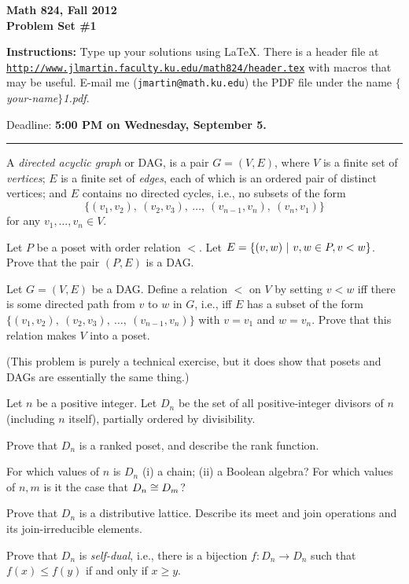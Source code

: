 

\bf Math 824, Fall 2012\\
Problem Set \#1\rm

{\bf Instructions:} Type up your solutions using LaTeX.  There is a
header file at\\
\href{http://www.jlmartin.faculty.ku.edu/math824/header.tex}{\tt http://www.jlmartin.faculty.ku.edu/math824/header.tex} with macros that may be useful.
E-mail me (\texttt{jmartin@math.ku.edu}) the PDF file under the name \textit{$\{$your-name$\}$1.pdf}.

Deadline: {\bf 5:00 PM on Wednesday, September 5.}
\medskip\hrule

\prob
A \emph{directed acyclic graph} or DAG, is a pair $G=(V,E)$, where $V$ 
is a finite set of \emph{vertices}; $E$ is a finite set of \emph{edges}, 
each of which is an ordered pair of distinct vertices; and $E$ contains 
no directed cycles, i.e., no subsets of the form
  $$\{(v_1,v_2),\: (v_2,v_3),\: \ldots,\: (v_{n-1},v_n),\: (v_n,v_1)\}$$
for any $v_1,\dots,v_n\in V$.

\probpart Let $P$ be a poset with order relation $<$.
Let $E=\{(v,w) ~|~ v,w \in P, v<w\}$.  Prove that the pair $(P,E)$ is a 
DAG.

\probpart Let $G=(V,E)$ be a DAG.  Define a relation $<$ on $V$ by 
setting 
$v<w$ iff there is some directed path from $v$ to $w$ in $G$, i.e., iff 
$E$ has a subset of the form $\{(v_1,v_2),\: (v_2,v_3),\: \ldots,\: 
(v_{n-1},v_n)\}$ with $v=v_1$ and $w=v_n$.  Prove that this relation 
makes $V$ into a poset.

(This problem is purely a technical exercise, but it does show that 
posets and DAGs are essentially the same thing.)

\prob
Let $n$ be a positive integer.
Let $D_n$ be the set of all positive-integer divisors of $n$ (including $n$
itself), partially ordered by divisibility.

\probpart Prove that $D_n$ is a ranked poset, and describe the rank function.

\probpart For which values of $n$ is $D_n$ (i) a chain; (ii) a Boolean 
algebra?  For which values of $n,m$ is it the case that $D_n\cong D_m$?

\probpart Prove that $D_n$ is a distributive lattice.
  Describe its meet and join operations and its join-irreducible elements.

\probpart Prove that $D_n$ is \emph{self-dual}, i.e., there is a bijection $f:D_n\to D_n$
    such that $f(x)\leq f(y)$ if and only if $x\geq y$.

